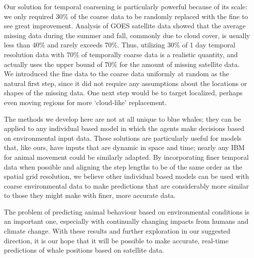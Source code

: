 \documentclass[11pt]{article}
\begin{document}
Our solution for temporal coarsening is particularly powerful because of its scale: we only required 30\% of the coarse data to be randomly replaced with the fine to see great improvement. Analysis of  GOES satellite data showed that the average missing data during the summer and fall, commonly due to cloud cover, is usually less than 40\% and rarely exceeds 70\%. Thus, utilizing 30\% of 1 day temporal resolution data with 70\% of temporally coarse data is a realistic quantity, and actually uses the upper bound of 70\% for the amount of missing satellite data. We introduced the fine data to the coarse data uniformly at random as the natural first step, since it did not require any assumptions about the locations or shapes of the missing data. One next step would be to target localized, perhaps even moving regions for more ‘cloud-like’ replacement.  \par 

The methods we develop here are not at all unique to blue whales; they can be applied to any individual based model in which the agents make decisions based on environmental input data. These solutions are particularly useful for models that, like ours, have inputs that are dynamic in space and time; nearly any IBM for animal movement could be similarly adapted. By incorporating finer temporal data when possible and aligning the step lengths to be of the same order as the spatial grid resolution, we believe other individual based models can be used with coarse environmental data to make predictions that are considerably more similar to those they might make with finer, more accurate data.\par 

The problem of predicting animal behaviour based on environmental conditions is an important one, especially with continually changing impacts from humans and climate change. With these results and further exploration in our suggested direction, it is our hope that it will be possible to make accurate, real-time predictions of whale positions based on satellite data.\par 

\printbibliography[title={References}]
\end{document}
